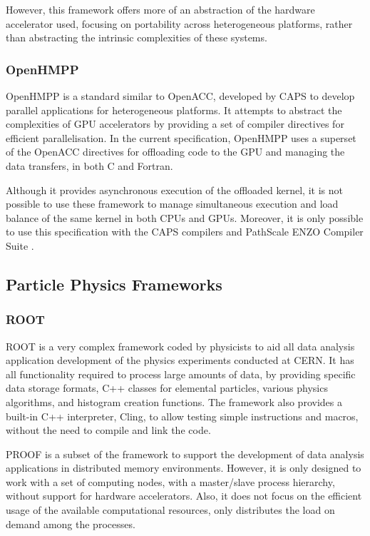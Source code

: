 However, this framework offers more of an abstraction of the hardware accelerator used, focusing on portability across heterogeneous platforms, rather than abstracting the intrinsic complexities of these systems.

\subsubsection*{OpenHMPP}

OpenHMPP \cite{OpenHMPP} is a standard similar to OpenACC, developed by CAPS \cite{CAPS} to develop parallel applications for heterogeneous platforms. It attempts to abstract the complexities of GPU accelerators by providing a set of compiler directives for efficient parallelisation. In the current specification, OpenHMPP uses a superset of the OpenACC directives for offloading code to the GPU and managing the data transfers, in both C and Fortran.

Although it provides asynchronous execution of the offloaded kernel, it is not possible to use these framework to manage simultaneous execution and load balance of the same kernel in both CPUs and GPUs. Moreover, it is only possible to use this specification with the CAPS compilers and PathScale ENZO Compiler Suite \cite{ENZO}.

\subsection{Particle Physics Frameworks}
\label{particle_frameworks}

\subsubsection*{ROOT}

ROOT \cite{CERN:ROOT} is a very complex framework coded by physicists to aid all data analysis application development of the physics experiments conducted at CERN. It has all functionality required to process large amounts of data, by providing specific data storage formats, C++ classes for elemental particles, various physics algorithms, and histogram creation functions. The framework also provides a built-in C++ interpreter, Cling, to allow testing simple instructions and macros, without the need to compile and link the code.

PROOF is a subset of the framework to support the development of data analysis applications in distributed memory environments. However, it is only designed to work with a set of computing nodes, with a master/slave process hierarchy, without support for hardware accelerators. Also, it does not focus on the efficient usage of the available computational resources, only distributes the load on demand among the processes.

